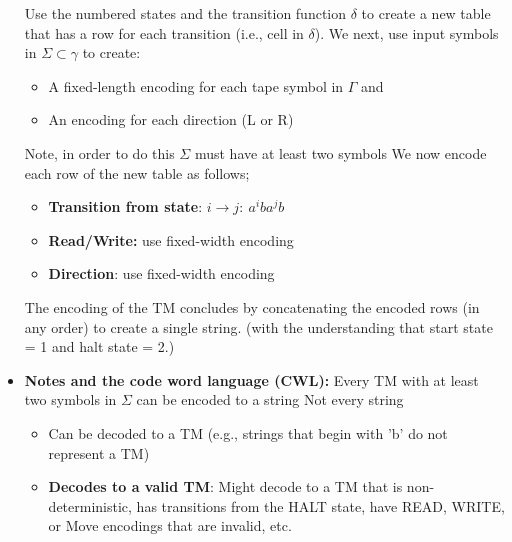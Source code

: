 \documentclass{report}
\begin{document}
\begin{itemize}
\begin{itemize}
            \end{itemize}
            \bigbreak \noindent 
            Use the numbered states and the transition function $\delta$ to create a new table that has a row for each transition (i.e., cell in $\delta$).
            \bigbreak \noindent 
            \bigbreak \noindent 
            We next, use input symbols in $\Sigma \subset \gamma $ to create:
            \bigbreak \noindent 
            \begin{itemize}
                \item A fixed-length encoding for each tape symbol in $\Gamma$ and
                \item An encoding for each direction (L or R)
            \end{itemize}
            \bigbreak \noindent 
            Note, in order to do this $\Sigma$ must have at least two symbols
            \bigbreak \noindent 
            \bigbreak \noindent 
            We now encode each row of the new table as follows;
            \begin{itemize}
                \item \textbf{Transition from state}: $i \to j:\ a^{i}ba^{j}b$
                \item \textbf{Read/Write:} use fixed-width encoding
                \item \textbf{Direction}: use fixed-width encoding
            \end{itemize}
            \bigbreak \noindent 
            \bigbreak \noindent 
            The encoding of the TM concludes by concatenating the encoded rows (in any order) to create a single string. (with the understanding that start state = 1 and halt state = 2.)
        \item \textbf{Notes and the code word language (CWL):} Every TM with at least two symbols in $\Sigma$ can be encoded to a string
            \bigbreak \noindent 
            Not every string
            \begin{itemize}
                \item Can be decoded to a TM (e.g., strings that begin with 'b' do not represent a TM)
                \item \textbf{Decodes to a valid TM}: Might decode to a TM that is non-deterministic, has transitions from the HALT state, have READ, WRITE, or Move encodings that are invalid, etc.


\end{itemize}
\end{itemize}
\end{document}
